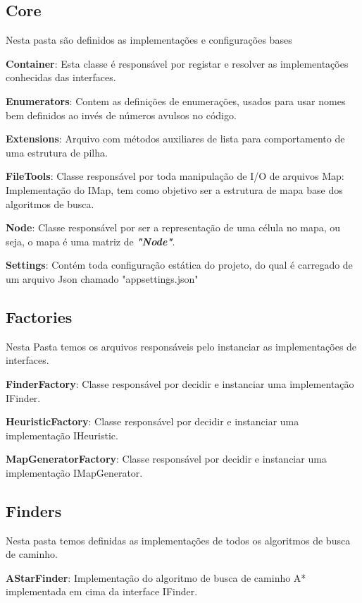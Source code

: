 \subsection{Core}

Nesta pasta são definidos as implementações e configurações bases

\textbf{Container}: Esta classe é responsável por registar e resolver as implementações conhecidas das interfaces.

\textbf{Enumerators}: Contem as definições de enumerações, usados para usar nomes bem definidos ao invés de números avulsos no código.

\textbf{Extensions}: Arquivo com métodos auxiliares de lista para comportamento de uma estrutura de pilha.

\textbf{FileTools}: Classe responsável por toda manipulação de I/O de arquivos
Map: Implementação do IMap, tem como objetivo ser a estrutura de mapa base dos algoritmos de busca.

\textbf{Node}: Classe responsável por ser a representação de uma célula no mapa, ou seja, o mapa é uma matriz de \textbf{\textit{"Node"}}.

\textbf{Settings}: Contém toda configuração estática do projeto, do qual é carregado de um arquivo Json chamado "appsettings.json"

\subsection{Factories}

Nesta Pasta temos os arquivos responsáveis pelo instanciar as implementações de interfaces.

\textbf{FinderFactory}: Classe responsável por decidir e instanciar uma implementação IFinder.

\textbf{HeuristicFactory}: Classe responsável por decidir e instanciar uma implementação IHeuristic.

\textbf{MapGeneratorFactory}: Classe responsável por decidir e instanciar uma implementação IMapGenerator.

\subsection{Finders}

Nesta pasta temos definidas as implementações de todos os algoritmos de busca de caminho.

\textbf{AStarFinder}: Implementação do algoritmo de busca de caminho A* implementada em cima da interface IFinder.

